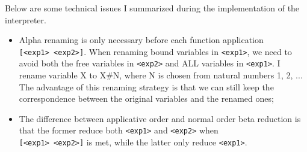 \documentclass[12pt,letterpaper]{article}
\begin{document}
Below are some technical issues I summarized during the implementation of the interpreter.
\begin{itemize}
\item Alpha renaming is only necessary before each function application\\ \texttt{[<exp1> <exp2>]}. When renaming bound variables in \texttt{<exp1>}, we need to avoid both the free variables in \texttt{<exp2>} and ALL variables in \texttt{<exp1>}. I rename variable X to X\#N, where N is chosen from natural numbers 1, 2, ... The advantage of this renaming strategy is that we can still keep the correspondence between the original variables and the renamed ones;
\item The difference between applicative order and normal order beta reduction is that the former reduce both \texttt{<exp1>} and \texttt{<exp2>} when\\ \texttt{[<exp1> <exp2>]} is met, while the latter only reduce \texttt{<exp1>}.
\end{itemize}
\end{document}
